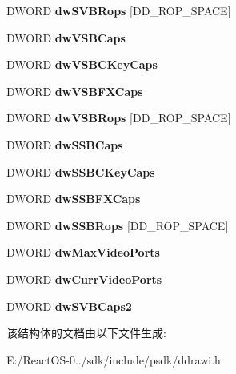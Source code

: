 \begin{DoxyCompactItemize}
D\+W\+O\+RD {\bfseries dw\+S\+V\+B\+Rops} \mbox{[}D\+D\+\_\+\+R\+O\+P\+\_\+\+S\+P\+A\+CE\mbox{]}
\item 
\mbox{\label{struct___d_d_c_o_r_e_c_a_p_s_a47d0a79464ef2d385b719eba9be12270}} 
D\+W\+O\+RD {\bfseries dw\+V\+S\+B\+Caps}
\item 
\mbox{\label{struct___d_d_c_o_r_e_c_a_p_s_aec0b64132b8856e2489d8fbc4ca8b49f}} 
D\+W\+O\+RD {\bfseries dw\+V\+S\+B\+C\+Key\+Caps}
\item 
\mbox{\label{struct___d_d_c_o_r_e_c_a_p_s_a5c0957f8c5d255683bef3167d20e1674}} 
D\+W\+O\+RD {\bfseries dw\+V\+S\+B\+F\+X\+Caps}
\item 
\mbox{\label{struct___d_d_c_o_r_e_c_a_p_s_aefa5bb84847be087239d79a9760801bd}} 
D\+W\+O\+RD {\bfseries dw\+V\+S\+B\+Rops} \mbox{[}D\+D\+\_\+\+R\+O\+P\+\_\+\+S\+P\+A\+CE\mbox{]}
\item 
\mbox{\label{struct___d_d_c_o_r_e_c_a_p_s_a24501af655929e2a3d44950ca14c50e8}} 
D\+W\+O\+RD {\bfseries dw\+S\+S\+B\+Caps}
\item 
\mbox{\label{struct___d_d_c_o_r_e_c_a_p_s_ac7778775dc4d49049a8d5f1e11e2ecfc}} 
D\+W\+O\+RD {\bfseries dw\+S\+S\+B\+C\+Key\+Caps}
\item 
\mbox{\label{struct___d_d_c_o_r_e_c_a_p_s_a7197d4a3004437a4e94c8515955cd028}} 
D\+W\+O\+RD {\bfseries dw\+S\+S\+B\+F\+X\+Caps}
\item 
\mbox{\label{struct___d_d_c_o_r_e_c_a_p_s_ab4237dba7a63dd80503d89f7552e1011}} 
D\+W\+O\+RD {\bfseries dw\+S\+S\+B\+Rops} \mbox{[}D\+D\+\_\+\+R\+O\+P\+\_\+\+S\+P\+A\+CE\mbox{]}
\item 
\mbox{\label{struct___d_d_c_o_r_e_c_a_p_s_a16508e8ea27e41d09d9071cc11bc7fca}} 
D\+W\+O\+RD {\bfseries dw\+Max\+Video\+Ports}
\item 
\mbox{\label{struct___d_d_c_o_r_e_c_a_p_s_a586b93af3f5669aafd092c4bef5c341f}} 
D\+W\+O\+RD {\bfseries dw\+Curr\+Video\+Ports}
\item 
\mbox{\label{struct___d_d_c_o_r_e_c_a_p_s_a2df867a73ada258a3f771434ba9b7f40}} 
D\+W\+O\+RD {\bfseries dw\+S\+V\+B\+Caps2}
\end{DoxyCompactItemize}


该结构体的文档由以下文件生成\+:\begin{DoxyCompactItemize}
\item 
E\+:/\+React\+O\+S-\/0../sdk/include/psdk/ddrawi.\+h\end{DoxyCompactItemize}
